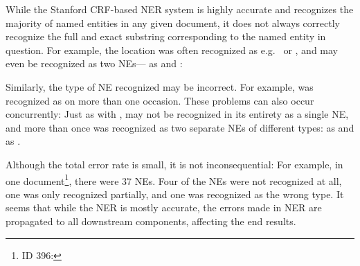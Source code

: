 While the Stanford CRF-based NER system is highly accurate and recognizes the majority of named entities in any given document, it does not always correctly recognize the full and exact substring corresponding to the named entity in question. For example, the location  was often recognized as e.g.\   or , and may even be recognized as two NEs--- as  and :

Similarly, the type of NE recognized may be incorrect. For example,  was recognized as  on more than one occasion. These problems can also occur concurrently: Just as with ,  may not be recognized in its entirety as a single NE, and more than once was recognized as two separate NEs of different types:  as  and  as .

Although the total error rate is small, it is not inconsequential: For example, in one document\footnote{ID 396: }, there were 37 NEs. Four of the NEs were not recognized at all, one was only recognized partially, and one was recognized as the wrong type. It seems that while the NER is mostly accurate, the errors made in NER are propagated to all downstream components, affecting the end results.
